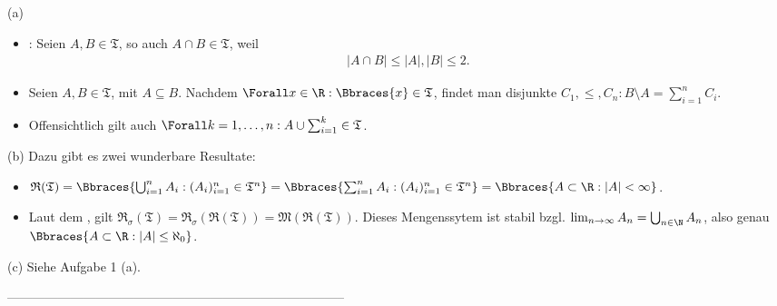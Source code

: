 \begin{solution}

(a)

\begin{itemize}

  \item {}: Seien $A, B \in \mathfrak{T}$, so auch $A \cap B \in \mathfrak{T}$, weil
  \begin{align*}
    |A \cap B| \leq |A|, |B| \leq 2.
  \end{align*}

  \item {} Seien $A, B \in \mathfrak{T}$, mit $A \subseteq B$. Nachdem $\Forall x \in \R: \Bbraces{x} \in \mathfrak{T}$, findet man disjunkte $C_1, \leq, C_n: B \setminus A = \sum_{i=1}^n C_i$.

  \item {} Offensichtlich gilt auch $\Forall k = 1, \ldots, n: A \cup \sum_{i=1}^k \in \mathfrak{T}$.

\end{itemize}

(b) Dazu gibt es zwei wunderbare Resultate:

\begin{itemize}

  \item $\mathfrak{R}(\mathfrak{T})
  = \Bbraces{\bigcup_{i=1}^n A_i: (A_i)_{i=1}^n \in \mathfrak{T}^n}
  = \Bbraces{\sum   _{i=1}^n A_i: (A_i)_{i=1}^n \in \mathfrak{T}^n}
  = \Bbraces{A \subset \R: |A| < \infty}$.

  \item Laut dem , gilt
  $\mathfrak{R}_\sigma(\mathfrak{T})
  = \mathfrak{R}_\sigma(\mathfrak{R}(\mathfrak{T}))
  = \mathfrak{M}(\mathfrak{R}(\mathfrak{T}))$.
  Dieses Mengenssytem ist stabil bzgl. $\lim_{n \to \infty} A_n = \bigcup_{n \in \N} A_n$, also genau $\Bbraces{A \subset \R: |A| \leq \aleph_0}$.

\end{itemize}

(c) Siehe Aufgabe 1 (a).

\end{solution}

--------------------------------------------------------------------------------

